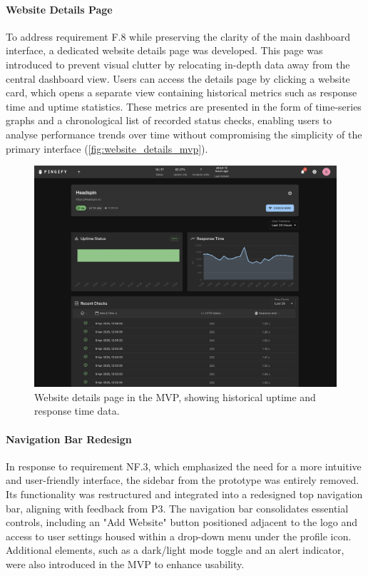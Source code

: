 \paragraph{Website Details Page}

To address requirement F.8 while preserving the clarity of the main dashboard interface, a dedicated website details page was developed. This page was introduced to prevent visual clutter by relocating in-depth data away from the central dashboard view. Users can access the details page by clicking a website card, which opens a separate view containing historical metrics such as response time and uptime statistics. These metrics are presented in the form of time-series graphs and a chronological list of recorded status checks, enabling users to analyse performance trends over time without compromising the simplicity of the primary interface (\autoref{fig:website_details_mvp}).

\begin{figure}[H]
\centering
\includegraphics[width=\textwidth]{figures/MVP-dashboard/MVP-websitedetails.png}
\caption{Website details page in the MVP, showing historical uptime and response time data.}
\label{fig:website_details_mvp}
\end{figure}
 
\paragraph{Navigation Bar Redesign}

In response to requirement NF.3, which emphasized the need for a more intuitive and user-friendly interface, the sidebar from the prototype was entirely removed. Its functionality was restructured and integrated into a redesigned top navigation bar, aligning with feedback from P3. The navigation bar consolidates essential controls, including an "Add Website" button positioned adjacent to the logo and access to user settings housed within a drop-down menu under the profile icon. Additional elements, such as a dark/light mode toggle and an alert indicator, were also introduced in the MVP to enhance usability.

